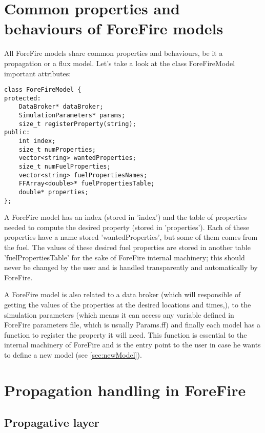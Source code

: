 \chapter{Common properties and behaviours of ForeFire models}
\label{sec:comprop}

All ForeFire models share common properties and behaviours, be it a propagation or a flux model. Let's take a look at the class ForeFireModel important attributes:

\begin{lstlisting}[caption={FluxModel.h},frame=single]
class ForeFireModel {
protected:
	DataBroker* dataBroker;
	SimulationParameters* params;
	size_t registerProperty(string);
public:
	int index;
	size_t numProperties; 
	vector<string> wantedProperties; 
	size_t numFuelProperties;
	vector<string> fuelPropertiesNames;
	FFArray<double>* fuelPropertiesTable;
	double* properties;
};
\end{lstlisting}

A ForeFire model has an index (stored in 'index') and the table of properties needed to compute the desired property (stored in 'properties'). Each of these properties have a name stored 'wantedProperties', but some of them comes from the fuel. The values of these desired fuel properties are stored in another table 'fuelPropertiesTable' for the sake of ForeFire internal machinery; this should never be changed by the user and is handled transparently and automatically by ForeFire.

A ForeFire model is also related to a data broker (which will responsible of getting the values of the properties at the desired locations and times,), to the simulation parameters (which means it can access any variable defined in ForeFire parameters file, which is usually Params.ff) and finally each model has a function to register the property it will need. This function is essential to the internal machinery of ForeFire and is the entry point to the user in case he wants to define a new model (see \ref{sec:newModel}).



\chapter{Propagation handling in ForeFire}

\section{Propagative layer}

